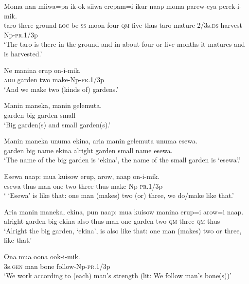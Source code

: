 \ea\label{ex:a:x9}
\gll  Moma  nan  miiwa=pa  ik-ok  siiwa  erepam=i  ikur  naap  moma parew-eya  perek-i-mik. \\
taro  there  ground-\textsc{loc}  be-\textsc{ss}  moon  four-\textsc{qm}  five  thus  taro     mature-2/3s.\textsc{ds}  harvest-Np-\textsc{pr}.1/3p \\


\glt ‘The taro is there in the ground and in about four or five months it matures and is harvested.’ \\
\z


\ea\label{ex:a:x10}
\gll  Ne  manina  erup  on-i-mik. \\
\textsc{add}  garden  two  make-Np-\textsc{pr}.1/3p \\
\glt ‘And we make two (kinds of) gardens.’ \\
\z


\ea\label{ex:a:x11}
\gll  Manin  maneka,  manin  gelemuta. \\
garden  big  garden  small \\
\glt ‘Big garden(s) and small garden(s).’ \\
\z


\ea\label{ex:a:x12}
\gll  Manin  maneka  unuma  ekina,  aria  manin  gelemuta  unuma  esewa. \\
garden  big  name  ekina  alright  garden  small  name  esewa. \\
\glt ‘The name of the big garden is ‘ekina’, the name of the small garden is ‘esewa’.’ \\
\z


\ea\label{ex:a:x13}
\gll  Esewa  naap:  mua  kuisow  erup,  arow,  naap  on-i-mik. \\
esewa  thus  man  one  two  three  thus  make-Np-\textsc{pr}.1/3p \\
\glt ‘ ‘Esewa’ is like that: one man (makes) two (or) three, we do/make like that.’ \\
\z


\ea\label{ex:a:x14}
\gll  Aria  manin  maneka,  ekina,  pun  naap:  mua  kuisow  manina  erup=i arow=i  naap. \\
alright  garden  big  ekina  also  thus  man  one  garden  two-\textsc{qm}           three-\textsc{qm}  thus \\


\glt ‘Alright the big garden, ‘ekina’, is also like that: one man (makes) two or three, like that.’ \\
\z


\ea\label{ex:a:x15}
\gll  Ona  mua  oona  ook-i-mik. \\
3s.\textsc{gen}  man  bone  follow-Np-\textsc{pr}.1/3p \\
\glt ‘We work according to (each) man’s strength (lit: We follow man’s bone(s))’ \\
\z


